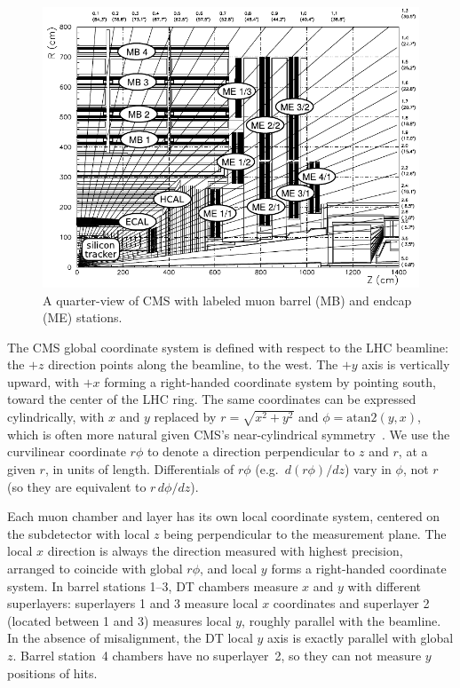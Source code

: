 \documentclass[12pt]{article}
\begin{document}
\begin{figure}
\hspace{-1.3 cm} \includegraphics[width=1.2\linewidth]{muon_system_labeled.pdf}

\caption{A quarter-view of CMS with labeled muon barrel (MB) and endcap (ME) stations. \label{fig:muon_system_labeled}}
\end{figure}

The CMS global coordinate system is defined with respect to the LHC
beamline: the $+z$ direction points along the beamline, to the west.
The $+y$ axis is vertically upward, with $+x$ forming a right-handed
coordinate system by pointing south, toward the center of the LHC
ring.  The same coordinates can be expressed cylindrically, with $x$
and $y$ replaced by $r = \sqrt{x^2 + y^2}$ and $\phi = \mbox{atan2}(y,
x)$, which is often more natural given CMS's near-cylindrical
symmetry~\cite{CMSConventions}.  We use the curvilinear coordinate
$r\phi$ to denote a direction perpendicular to $z$ and $r$, at a given
$r$, in units of length.  Differentials of $r\phi$
(e.g.\ $d(r\phi)/dz$) vary in $\phi$, not $r$ (so they are equivalent
to $r \, d\phi/dz$).

Each muon chamber and layer has its own local coordinate system,
centered on the subdetector with local $z$ being perpendicular to the
measurement plane.  The local $x$ direction is always the direction
measured with highest precision, arranged to coincide with global
$r\phi$, and local $y$ forms a right-handed coordinate system.  In
barrel stations 1--3, DT chambers measure $x$ and $y$ with different
superlayers: superlayers 1 and 3 measure local $x$ coordinates and
superlayer 2 (located between 1 and 3) measures local $y$, roughly
parallel with the beamline.  In the absence of misalignment, the DT
local $y$ axis is exactly parallel with global $z$.  Barrel station~4
chambers have no superlayer~2, so they can not measure $y$ positions
of hits.
\end{document}
